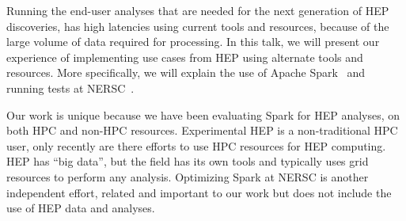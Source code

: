 Running the end-user analyses that are needed for the next generation of HEP discoveries,  
has high latencies using current tools and resources, because of the large volume of data required for processing. 
In this talk, we will present our
experience of implementing use cases from HEP using alternate tools and resources. 
More specifically, we will explain the use of Apache Spark~\cite{spark,spark1} and running tests at NERSC~\cite{nersc-spark}. 

Our work is unique because we have been evaluating Spark for HEP analyses, 
on both HPC and non-HPC resources.  
Experimental HEP is a non-traditional HPC user, only recently are there efforts to use HPC resources for 
HEP computing. HEP has ``big data'', but the field has 
its own tools and typically uses grid resources to perform any analysis. 
Optimizing Spark at NERSC is another independent effort, related and important to our work but 
does not include the use of HEP data and analyses. 
